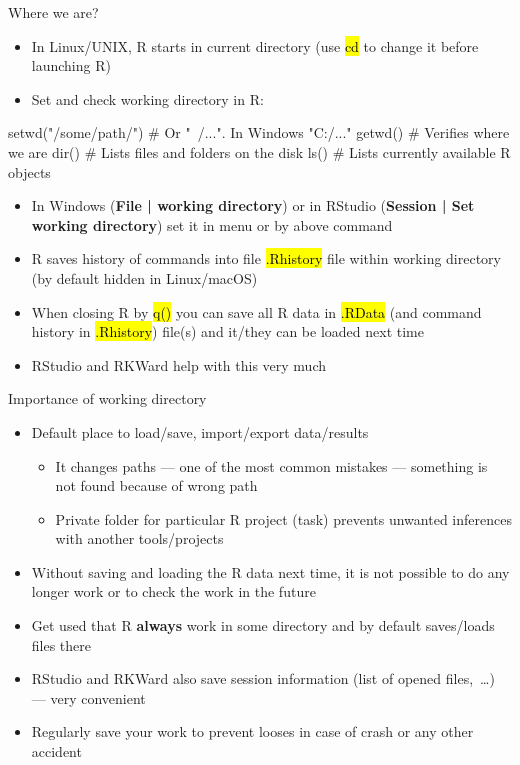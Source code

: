 \documentclass[compress, ucs, xelatex, 11pt, xcolor=svgnames,
	hyperref={
		bookmarks=true,
		unicode=true,
		colorlinks=true,
		pdftitle={Molecular data in R},
		plainpages=false,
		pdfauthor={Vojtech Zeisek},
		pdfsubject={Course about phylogeny and evolution in R},
		pdfcreator={XeLaTeX},
		pdfkeywords={R, evolution, phylogeny, molecular data},
		linkcolor=Tomato,
		anchorcolor=SaddleBrown,
		citecolor=Goldenrod,
		filecolor=DarkMagenta,
		menucolor=Sienna,
		urlcolor=DarkTurquoise,
		pdftex},
	url={hyphens, lowtilde} %
	]{beamer}
\renewcommand{\texttt}[1]{\hl{\ttfamily #1}}
\begin{document}
\begin{frame}[fragile]{Where we are?}
	\begin{itemize}
		\item In Linux/UNIX, R starts in current directory (use \texttt{cd} to change it before launching R)
		\item \alert{Set and check working directory} in R:
	\end{itemize}
	\begin{spluscode}
    setwd("/some/path/") # Or "~/...". In Windows "C:/..."
    getwd() # Verifies where we are
    dir() # Lists files and folders on the disk
    ls() # Lists currently available R objects
	\end{spluscode}
	\begin{itemize}
		\item In Windows (\textbf{File | working directory}) or in RStudio (\textbf{Session | Set working directory}) set it in menu or by above command
		\item R saves history of commands into file \texttt{.Rhistory} file within working directory (by default hidden in Linux/macOS)
		\item When closing R by \texttt{q()} you can save all R data in \texttt{.RData} (and command history in \texttt{.Rhistory}) file(s) and it/they can be loaded next time
		\item RStudio and RKWard help with this very much
	\end{itemize}
\end{frame}

\begin{frame}{Importance of working directory}
	\begin{itemize}
		\item Default place to load/save, import/export data/results
		\begin{itemize}
			\item It changes paths --- one of the most common mistakes --- something is not found because of wrong path
			\item Private folder for particular R project (task) prevents unwanted inferences with another tools/projects
		\end{itemize}
		\item Without saving and loading the R data next time, it is not possible to do any longer work or to check the work in the future
		\item \alert{Get used that R \textbf{always} work in some directory and by default saves/loads files there}
		\item RStudio and RKWard also save session information (list of opened files,~\ldots) --- very convenient
		\item Regularly save your work to prevent looses in case of crash or any other accident
	\end{itemize}
\end{frame}
\end{document}
